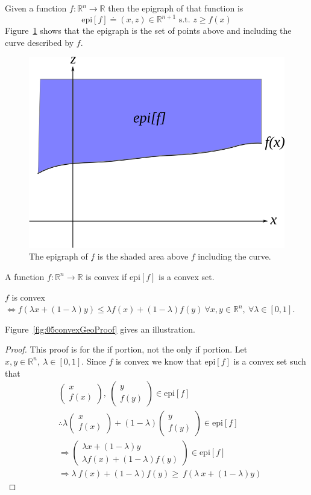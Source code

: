 \begin{definition}
Given a function $f:\mathbb{R}^n\to\mathbb{R}$ then the epigraph of that function is
$$\text{epi}[f] \doteq (x,z)\in\mathbb{R}^{n+1} \text{~s.t.~} z\geq f(x)$$
Figure~\ref{fig:05epigraph} shows that the epigraph is the set of points above and including the curve described by $f$.
\end{definition}

\begin{figure}[ht!]
\centering
\includegraphics[width=.4\textwidth]{images/05epigraph}
\caption{The epigraph of $f$ is the shaded area above $f$ including the curve.}
\label{fig:05epigraph}
\end{figure}

\begin{definition}
A function $f:\mathbb{R}^n\to\mathbb{R}$ is convex if $\text{epi}[f]$ is a convex set.
\end{definition}

\begin{theorem}
$f$ is convex $\Leftrightarrow f(\lambda x + (1-\lambda)y)\leq \lambda f(x) + (1-\lambda)f(y)~\forall x,y\in\mathbb{R}^n,~\forall \lambda\in[0,1]$.
\end{theorem}
Figure~\ref{fig:05convexGeoProof} gives an illustration.
\begin{proof}
This proof is for the if portion, not the only if portion.
Let $x,y\in\mathbb{R}^n,~\lambda\in[0,1]$.
Since $f$ is convex we know that $\text{epi}[f]$ is a convex set such that
\begin{align*}
&\left(\begin{array}{c} x \\ f(x) \end{array}\right),~\left(\begin{array}{c} y \\ f(y) \end{array}\right) \in\text{epi}[f] \\
&\therefore\lambda\left(\begin{array}{c} x \\ f(x) \end{array}\right) + (1-\lambda)\left(\begin{array}{c} y \\ f(y) \end{array}\right) \in\text{epi}[f] \\
&\Rightarrow\left(\begin{array}{c} \lambda x+(1-\lambda)y \\ \lambda f(x) + (1-\lambda)f(y) \end{array}\right) \in\text{epi}[f] \\
&\Rightarrow\lambda~f (x) + (1-\lambda) f (y) \geq~f (\lambda~x + (1-\lambda) y)
\end{align*}
\end{proof}

